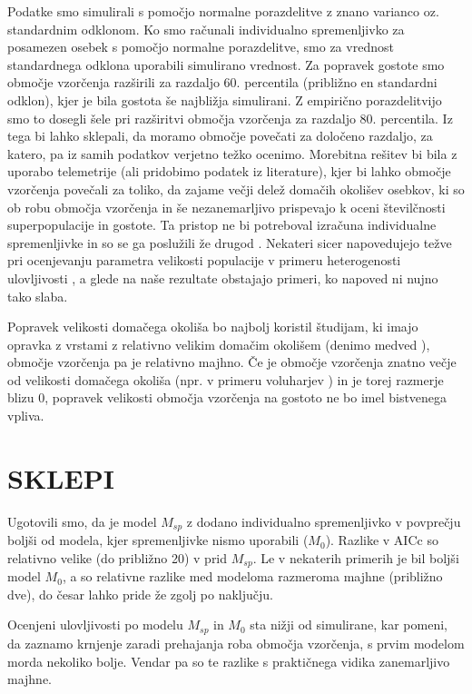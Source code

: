 Podatke smo simulirali s pomočjo normalne porazdelitve z znano varianco oz. standardnim odklonom. Ko smo računali individualno spremenljivko za posamezen osebek s pomočjo normalne porazdelitve, smo za vrednost standardnega odklona uporabili simulirano vrednost. Za popravek gostote smo območje vzorčenja razširili za razdaljo 60. percentila (približno en standardni odklon), kjer je bila gostota še najbližja simulirani. Z empirično porazdelitvijo smo to dosegli šele pri razširitvi območja vzorčenja za razdaljo 80. percentila. Iz tega bi lahko sklepali, da moramo območje povečati za določeno razdaljo, za katero, pa iz samih podatkov verjetno težko ocenimo. Morebitna rešitev bi bila z uporabo telemetrije (ali pridobimo podatek iz literature), kjer bi lahko območje vzorčenja povečali za toliko, da zajame večji delež domačih okolišev osebkov, ki so ob robu območja vzorčenja in še nezanemarljivo prispevajo k oceni številčnosti superpopulacije in gostote. Ta pristop ne bi potreboval izračuna individualne spremenljivke in so se ga poslužili že drugod \citep{ivan-et-al-2013-aux}. Nekateri sicer napovedujejo težve pri ocenjevanju parametra velikosti populacije v primeru heterogenosti ulovljivosti \citep{link_nonidentifiability_2003}, a glede na naše rezultate obstajajo primeri, ko napoved ni nujno tako slaba.

Popravek velikosti domačega okoliša bo najbolj koristil študijam, ki imajo opravka z vrstami z relativno velikim domačim okolišem (denimo medved \citep{miller_brown_1997, whittington_comparison_2015}), območje vzorčenja pa je relativno majhno. Če je območje vzorčenja znatno večje od velikosti domačega okoliša (npr. v primeru voluharjev \citealp{erlinge_density-related_1990}) in je torej razmerje blizu 0, popravek velikosti območja vzorčenja na gostoto ne bo imel bistvenega vpliva.

\newpage
\section{SKLEPI}
Ugotovili smo, da je model $M_{sp}$ z dodano individualno spremenljivko v povprečju boljši od modela, kjer spremenljivke nismo uporabili ($M_0$). Razlike v AICc so relativno velike (do približno 20) v prid $M_{sp}$. Le v nekaterih primerih je bil boljši model $M_0$, a so relativne razlike med modeloma razmeroma majhne (približno dve), do česar lahko pride že zgolj po naključju.

Ocenjeni ulovljivosti po modelu $M_{sp}$ in $M_0$ sta nižji od simulirane, kar pomeni, da zaznamo krnjenje zaradi prehajanja roba območja vzorčenja, s prvim modelom morda nekoliko bolje. Vendar pa so te razlike s praktičnega vidika zanemarljivo majhne.

